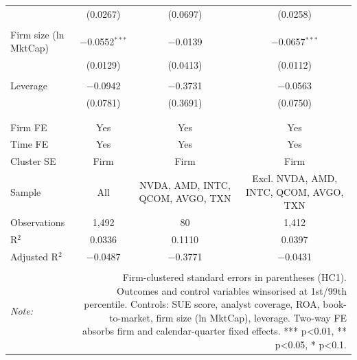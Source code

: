 \begin{table}[!htbp]
\begin{tabular}{@{\extracolsep{5pt}}lccc}
  & (0.0267) & (0.0697) & (0.0258) \\ 
  & & & \\ 
 Firm size (ln MktCap) & $-$0.0552$^{***}$ & $-$0.0139 & $-$0.0657$^{***}$ \\ 
  & (0.0129) & (0.0413) & (0.0112) \\ 
  & & & \\ 
 Leverage & $-$0.0942 & $-$0.3731 & $-$0.0563 \\ 
  & (0.0781) & (0.3691) & (0.0750) \\ 
  & & & \\ 
\hline \\[-1.8ex] 
Firm FE & Yes & Yes & Yes \\ 
Time FE & Yes & Yes & Yes \\ 
Cluster SE & Firm & Firm & Firm \\ 
Sample & All & NVDA, AMD, INTC, QCOM, AVGO, TXN & Excl. NVDA, AMD, INTC, QCOM, AVGO, TXN \\ 
Observations & 1,492 & 80 & 1,412 \\ 
R$^{2}$ & 0.0336 & 0.1110 & 0.0397 \\ 
Adjusted R$^{2}$ & $-$0.0487 & $-$0.3771 & $-$0.0431 \\ 
\hline 
\hline \\[-1.8ex] 
\textit{Note:}  & \multicolumn{3}{r}{Firm-clustered standard errors in parentheses (HC1). Outcomes and control variables winsorised at 1st/99th percentile. Controls: SUE score, analyst coverage, ROA, book-to-market, firm size (ln MktCap), leverage. Two-way FE absorbs firm and calendar-quarter fixed effects. *** p<0.01, ** p<0.05, * p<0.1.} \\ 
\end{tabular} 
\end{table} 
